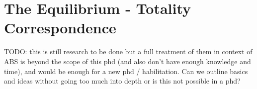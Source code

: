 \chapter{The Equilibrium - Totality Correspondence}
\label{ch:equilibrium_totality}

TODO: this is still research to be done but a full treatment of them in context of ABS is beyond the scope of this phd (and also don't have enough knowledge and time), and would be enough for a new phd / habilitation. Can we outline basics and ideas without going too much into depth or is this not possible in a phd?